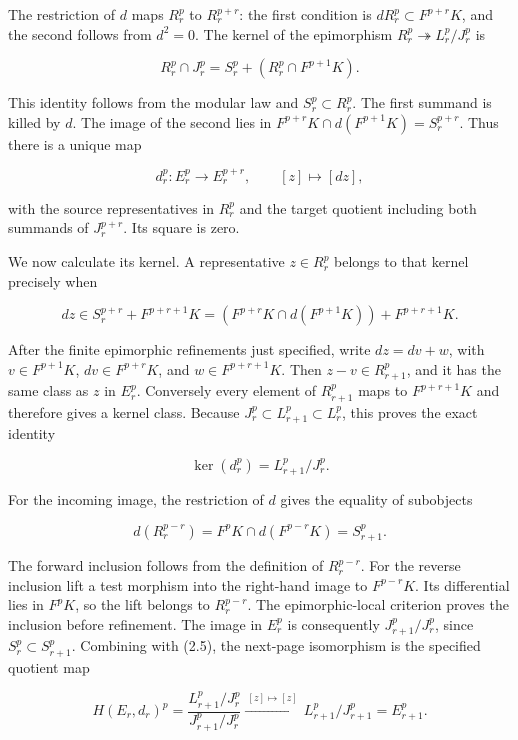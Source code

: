 \documentclass[11pt]{article}
\begin{document}
The restriction of \(d\) maps \(R_r^p\) to \(R_r^{p+r}\): the first condition is \(dR_r^p\subset F^{p+r}K\), and the second follows from \(d^2=0\). The kernel of the epimorphism \(R_r^p\twoheadrightarrow L_r^p/J_r^p\) is

\[
R_r^p\cap J_r^p=S_r^p+(R_r^p\cap F^{p+1}K).       \tag{2.3}
\]

This identity follows from the modular law and \(S_r^p\subset R_r^p\). The first summand is killed by \(d\). The image of the second lies in \(F^{p+r}K\cap d(F^{p+1}K)=S_r^{p+r}\). Thus there is a unique map

\[
d_r^p:E_r^p\longrightarrow E_r^{p+r},\qquad
[z]\longmapsto[dz],                     \tag{2.4}
\]

with the source representatives in \(R_r^p\) and the target quotient including both summands of \(J_r^{p+r}\). Its square is zero.

We now calculate its kernel. A representative \(z\in R_r^p\) belongs to that kernel precisely when

\[
dz\in S_r^{p+r}+F^{p+r+1}K
=(F^{p+r}K\cap d(F^{p+1}K))+F^{p+r+1}K.
\]

After the finite epimorphic refinements just specified, write \(dz=dv+w\), with \(v\in F^{p+1}K\), \(dv\in F^{p+r}K\), and \(w\in F^{p+r+1}K\). Then \(z-v\in R_{r+1}^p\), and it has the same class as \(z\) in \(E_r^p\). Conversely every element of \(R_{r+1}^p\) maps to \(F^{p+r+1}K\) and therefore gives a kernel class. Because \(J_r^p\subset L_{r+1}^p\subset L_r^p\), this proves the exact identity

\[
\ker(d_r^p)=L_{r+1}^p/J_r^p.            \tag{2.5}
\]

For the incoming image, the restriction of \(d\) gives the equality of subobjects

\[
d(R_r^{p-r})=F^pK\cap d(F^{p-r}K)=S_{r+1}^p.       \tag{2.6}
\]

The forward inclusion follows from the definition of \(R_r^{p-r}\). For the reverse inclusion lift a test morphism into the right-hand image to \(F^{p-r}K\). Its differential lies in \(F^pK\), so the lift belongs to \(R_r^{p-r}\). The epimorphic-local criterion proves the inclusion before refinement. The image in \(E_r^p\) is consequently \(J_{r+1}^p/J_r^p\), since \(S_r^p\subset S_{r+1}^p\). Combining with (2.5), the next-page isomorphism is the specified quotient map

\[
H(E_r,d_r)^p
=\frac{L_{r+1}^p/J_r^p}{J_{r+1}^p/J_r^p}
\xrightarrow{\ [z]\mapsto[z]\ }
L_{r+1}^p/J_{r+1}^p=E_{r+1}^p.          \tag{2.7}
\]
\end{document}
